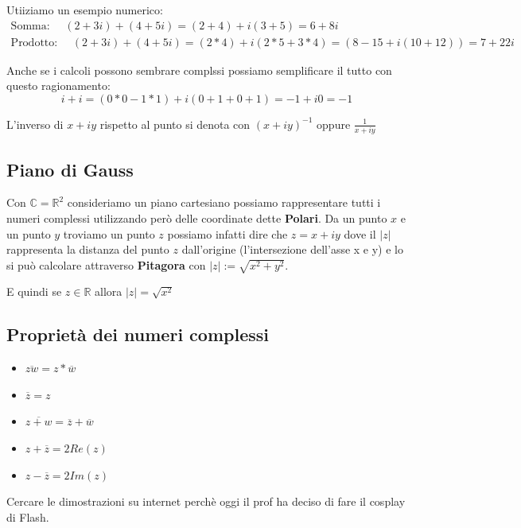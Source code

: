 \documentclass{article}
\begin{document}
Utiiziamo un esempio numerico:
\begin{align}
        \textrm{Somma: } \quad (2 + 3i) + (4 + 5i) = (2 + 4) + i(3 + 5) = 6 + 8i \\
        \textrm{Prodotto: } \quad (2 + 3i) + (4 + 5i) = (2 * 4) + i(2*5 + 3*4) = (8-15 + i(10+12)) = 7 + 22i
\end{align}

Anche se i calcoli possono sembrare complssi possiamo semplificare il tutto con questo ragionamento:
\begin{equation}
        i + i = (0*0 - 1*1) + i(0+1 + 0+1) = -1+ i0 = -1
\end{equation}

L'inverso di $x + iy$ rispetto al punto si denota con ${(x + iy)}^{-1}$ oppure $\frac{1}{x + iy}$


\subsection{Piano di Gauss}
Con $\mathbb{C} = \mathbb{R}^2$ consideriamo un piano cartesiano possiamo rappresentare tutti i numeri complessi utilizzando però delle coordinate dette \textbf{Polari}.
Da un punto $x$ e un punto $y$ troviamo un punto $z$ possiamo infatti dire che $z = x+iy$ dove il $|z|$  rappresenta la distanza del punto $z$ dall'origine (l'intersezione dell'asse x e y) e lo si può calcolare attraverso \textbf{Pitagora} con $|z| := \sqrt{x^2+y^2}$. \par
E quindi se $z \in \mathbb{R}$ allora $|z| = \sqrt{x^2}$

\subsection{Proprietà dei numeri complessi}

\begin{itemize}
        \item $\overline{zw} = z * \overline{w}$ \\
        \item $\overline{z} = z$ \\
        \item $\overline{z+w} = \overline{z} + \overline{w}$ \\
        \item $z+\overline{z}=2Re(z)$ \\
        \item $z - \overline{z}=2Im(z)$ \\
\end{itemize}
Cercare le dimostrazioni su internet perchè oggi il prof ha deciso di fare il cosplay di Flash.
\end{document}
